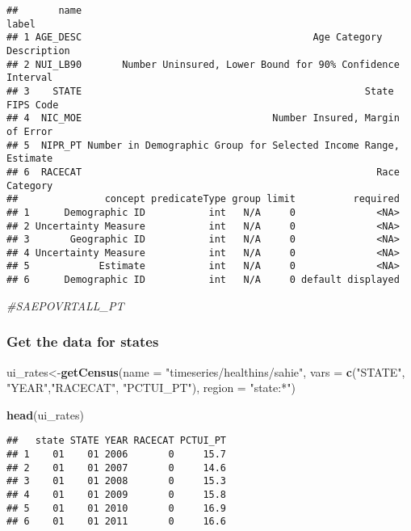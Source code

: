 \documentclass[]{article}
\newenvironment{Shaded}{\begin{snugshade}}{\end{snugshade}}
\newcommand{\KeywordTok}[1]{\textcolor[rgb]{0.13,0.29,0.53}{\textbf{#1}}}
\newcommand{\DataTypeTok}[1]{\textcolor[rgb]{0.13,0.29,0.53}{#1}}
\newcommand{\StringTok}[1]{\textcolor[rgb]{0.31,0.60,0.02}{#1}}
\newcommand{\CommentTok}[1]{\textcolor[rgb]{0.56,0.35,0.01}{\textit{#1}}}
\newcommand{\NormalTok}[1]{#1}
\begin{document}
\begin{verbatim}
##       name                                                           label
## 1 AGE_DESC                                        Age Category Description
## 2 NUI_LB90       Number Uninsured, Lower Bound for 90% Confidence Interval
## 3    STATE                                                 State FIPS Code
## 4  NIC_MOE                                 Number Insured, Margin of Error
## 5  NIPR_PT Number in Demographic Group for Selected Income Range, Estimate
## 6  RACECAT                                                   Race Category
##               concept predicateType group limit          required
## 1      Demographic ID           int   N/A     0              <NA>
## 2 Uncertainty Measure           int   N/A     0              <NA>
## 3       Geographic ID           int   N/A     0              <NA>
## 4 Uncertainty Measure           int   N/A     0              <NA>
## 5            Estimate           int   N/A     0              <NA>
## 6      Demographic ID           int   N/A     0 default displayed
\end{verbatim}

\begin{Shaded}
\begin{Highlighting}[]
\CommentTok{#SAEPOVRTALL_PT}
\end{Highlighting}
\end{Shaded}

\subsubsection{Get the data for states}\label{get-the-data-for-states}

\begin{Shaded}
\begin{Highlighting}[]
\NormalTok{ui_rates<-}\KeywordTok{getCensus}\NormalTok{(}\DataTypeTok{name =} \StringTok{"timeseries/healthins/sahie"}\NormalTok{,}
          \DataTypeTok{vars =} \KeywordTok{c}\NormalTok{(}\StringTok{"STATE"}\NormalTok{, }\StringTok{"YEAR"}\NormalTok{,}\StringTok{"RACECAT"}\NormalTok{, }\StringTok{"PCTUI_PT"}\NormalTok{), }
          \DataTypeTok{region =} \StringTok{"state:*"}\NormalTok{)}



\KeywordTok{head}\NormalTok{(ui_rates)}
\end{Highlighting}
\end{Shaded}

\begin{verbatim}
##   state STATE YEAR RACECAT PCTUI_PT
## 1    01    01 2006       0     15.7
## 2    01    01 2007       0     14.6
## 3    01    01 2008       0     15.3
## 4    01    01 2009       0     15.8
## 5    01    01 2010       0     16.9
## 6    01    01 2011       0     16.6
\end{verbatim}
\end{document}
